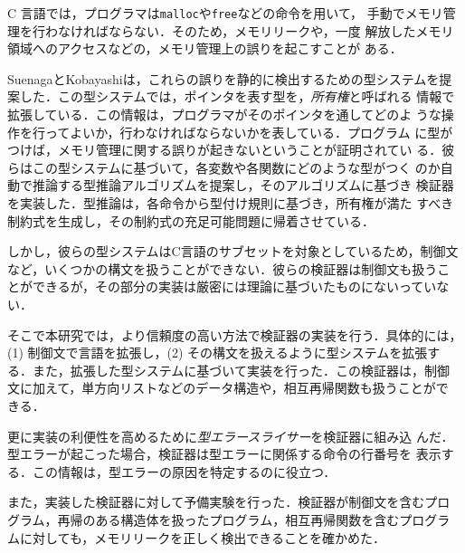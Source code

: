 \begin{jabstract}
  C 言語では，プログラマは\verb|malloc|や\verb|free|などの命令を用いて，
  手動でメモリ管理を行わなければならない．そのため，メモリリークや，一度
  解放したメモリ領域へのアクセスなどの，メモリ管理上の誤りを起こすことが
  ある．

  SuenagaとKobayashiは，これらの誤りを静的に検出するための型システムを提
  案した．この型システムでは，ポインタを表す型を，\emph{所有権}と呼ばれる
  情報で拡張している．この情報は，プログラマがそのポインタを通してどのよ
  うな操作を行ってよいか，行わなければならないかを表している．プログラム
  に型がつけば，メモリ管理に関する誤りが起きないということが証明されてい
  る．彼らはこの型システムに基づいて，各変数や各関数にどのような型がつく
  のか自動で推論する型推論アルゴリズムを提案し，そのアルゴリズムに基づき
  検証器を実装した．型推論は，各命令から型付け規則に基づき，所有権が満た
  すべき制約式を生成し，その制約式の充足可能問題に帰着させている．

  しかし，彼らの型システムはC言語のサブセットを対象としているため，制御文
  など，いくつかの構文を扱うことができない．彼らの検証器は制御文も扱うこ
  とができるが，その部分の実装は厳密には理論に基づいたものにないっていな
  い．



  そこで本研究では，より信頼度の高い方法で検証器の実装を行う．具体的には，
  (1) 制御文で言語を拡張し，(2) その構文を扱えるように型システムを拡張す
  る．また，拡張した型システムに基づいて実装を行った．この検証器は，制御
  文に加えて，単方向リストなどのデータ構造や，相互再帰関数も扱うことがで
  きる．

  更に実装の利便性を高めるために\emph{型エラースライサー}を検証器に組み込
  んだ．型エラーが起こった場合，検証器は型エラーに関係する命令の行番号を
  表示する．この情報は，型エラーの原因を特定するのに役立つ．

  また，実装した検証器に対して予備実験を行った．検証器が制御文を含むプロ
  グラム，再帰のある構造体を扱ったプログラム，相互再帰関数を含むプログラ
  ムに対しても，メモリリークを正しく検出できることを確かめた．
\end{jabstract}